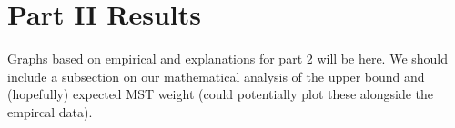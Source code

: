 \section{Part II Results}
\label{sec:part2}

\paragraph{}
Graphs based on empirical and explanations for part 2 will be here.  We should
include a subsection on our mathematical analysis of the upper bound and
(hopefully) expected MST weight (could potentially plot these alongside the
empircal data).
